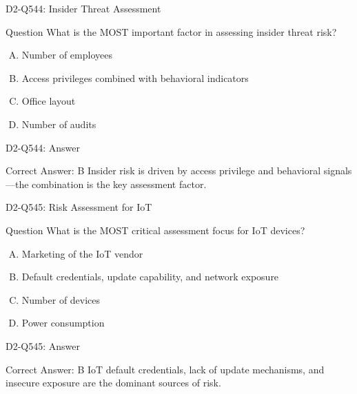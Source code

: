 \documentclass{beamer}
\begin{document}
\begin{frame}{D2-Q544: Insider Threat Assessment}
	\begin{block}{Question}
		What is the MOST important factor in assessing insider threat risk?
	\end{block}
	\begin{enumerate}[(A)]
		\item Number of employees
		\item Access privileges combined with behavioral indicators
		\item Office layout
		\item Number of audits
	\end{enumerate}
\end{frame}
\begin{frame}{D2-Q544: Answer}
	\begin{block}{Correct Answer: B}
		Insider risk is driven by access privilege and behavioral signals—the combination is the key assessment factor.
	\end{block}
\end{frame}
	
	
	\begin{frame}{D2-Q545: Risk Assessment for IoT}
		\begin{block}{Question}
			What is the MOST critical assessment focus for IoT devices?
		\end{block}
		\begin{enumerate}[(A)]
			\item Marketing of the IoT vendor
			\item Default credentials, update capability, and network exposure
			\item Number of devices
			\item Power consumption
		\end{enumerate}
	\end{frame}
	\begin{frame}{D2-Q545: Answer}
		\begin{block}{Correct Answer: B}
			IoT default credentials, lack of update mechanisms, and insecure exposure are the dominant sources of risk.
		\end{block}
	\end{frame}
	
\end{document}
